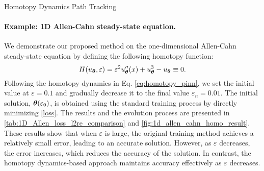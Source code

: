 \begin{algorithm}[H]
	\centering
    \footnotesize
	\caption{Homotopy Dynamics Path Tracking}
	\label{alg1-FEuler}
	\begin{algorithmic}
	\end{algorithmic}
\end{algorithm}

\paragraph{Example: 1D Allen-Cahn steady-state equation.}
We demonstrate our proposed method on the one-dimensional Allen-Cahn steady-state equation by defining the following homotopy function:
\begin{equation}
    H(u_{\boldsymbol{\theta}},\varepsilon) = \varepsilon^2 u_{\boldsymbol{\theta}}^{\prime \prime}(x) + {u_{\boldsymbol{\theta}}^3 - u_{\boldsymbol{\theta}}} \equiv 0.
\end{equation}
Following the homotopy dynamics in Eq. \eqref{eq:homotopy_pinn}, we set the initial value at $\varepsilon = 0.1$ and gradually decrease it to the final value $\varepsilon_n = 0.01$. The initial solution, ${\boldsymbol{\theta}(\varepsilon_0)}$, is obtained using the standard training process by directly minimizing \eqref{loss}. The results and the evolution process are presented in \cref{tab:1D_Allen_loss_l2re_comparison} and \cref{fig:1d_allen_cahn_homo_result}. These results show that when $\varepsilon$ is large, the original training method achieves a relatively small error, leading to an accurate solution. However, as $\varepsilon$ decreases, the error increases, which reduces the accuracy of the solution. In contrast, the homotopy dynamics-based approach maintains accuracy effectively as $\varepsilon$ decreases.

